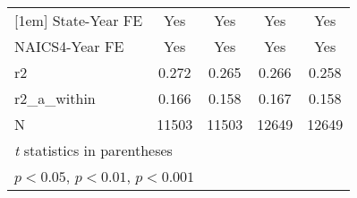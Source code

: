 {\begin{tabular}{l*{4}{c}}
[1em]
State-Year FE&         Yes         &         Yes         &         Yes         &         Yes         \\
[1em]
NAICS4-Year FE&         Yes         &         Yes         &         Yes         &         Yes         \\
\hline
r2          &       0.272         &       0.265         &       0.266         &       0.258         \\
r2\_a\_within &       0.166         &       0.158         &       0.167         &       0.158         \\
N           &       11503         &       11503         &       12649         &       12649         \\
\hline\hline
\multicolumn{5}{l}{\footnotesize \textit{t} statistics in parentheses}\\
\multicolumn{5}{l}{\footnotesize \sym{*} \(p<0.05\), \sym{**} \(p<0.01\), \sym{***} \(p<0.001\)}\\
\end{tabular}
}
